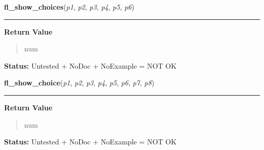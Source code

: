 \hspace{.8\funcindent}\begin{boxedminipage}{\funcwidth}

    \raggedright \textbf{fl\_show\_choices}(\textit{p1}, \textit{p2}, \textit{p3}, \textit{p4}, \textit{p5}, \textit{p6})

    \vspace{-1.5ex}

    \rule{\textwidth}{0.5\fboxrule}
\setlength{\parskip}{2ex}
\setlength{\parskip}{1ex}
      \textbf{Return Value}
    \vspace{-1ex}

      \begin{quote}
      num

      \end{quote}

\textbf{Status:} Untested + NoDoc + NoExample = NOT OK



    \end{boxedminipage}

    \label{xformslib:library:fl_show_choice}

    \vspace{0.5ex}

\hspace{.8\funcindent}\begin{boxedminipage}{\funcwidth}

    \raggedright \textbf{fl\_show\_choice}(\textit{p1}, \textit{p2}, \textit{p3}, \textit{p4}, \textit{p5}, \textit{p6}, \textit{p7}, \textit{p8})

    \vspace{-1.5ex}

    \rule{\textwidth}{0.5\fboxrule}
\setlength{\parskip}{2ex}
\setlength{\parskip}{1ex}
      \textbf{Return Value}
    \vspace{-1ex}

      \begin{quote}
      num

      \end{quote}

\textbf{Status:} Untested + NoDoc + NoExample = NOT OK



    \end{boxedminipage}

    \label{xformslib:library:fl_hide_choice}

